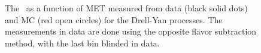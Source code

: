 \begin{figure}[!hbtp]
\centering
{}
\caption{
 The \routin\, as a function of MET measured from data (black solid dots) 
and MC (red open circles) for the Drell-Yan processes. The measurements 
in data are done using the opposite flavor subtraction method, with the 
last bin blinded in data. }
\label{fig:dyr_ww}
\end{figure}

